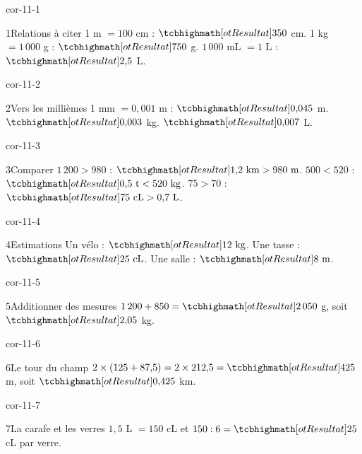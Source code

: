 \clearpage\pagestyle{otMain}\setlength{\otBlocEspacement}{2.5mm}\fontsize{11}{15}\selectfont{}
\begin{blocLivre}{cor-11-1}\begin{corrige}{1}{Relations à citer}
1 m $=100$ cm : $\res{350}$ cm. 1 kg $=1\,000$ g : $\res{750}$ g. $1\,000$ mL $=1$ L : $\res{2{,}5}$ L.
\end{corrige}\end{blocLivre}
\begin{blocLivre}{cor-11-2}\begin{corrige}{2}{Vers les millièmes}
1 mm $=0{,}001$ m : $\res{0{,}045}$ m. $\res{0{,}003}$ kg. $\res{0{,}007}$ L.
\end{corrige}\end{blocLivre}
\begin{blocLivre}{cor-11-3}\begin{corrige}{3}{Comparer}
$1\,200>980$ : $\res{1{,}2\ \mathrm{km}>980\ \mathrm m}$. $500<520$ : $\res{0{,}5\ \mathrm t<520\ \mathrm{kg}}$. $75>70$ : $\res{75\ \mathrm{cL}>0{,}7\ \mathrm L}$.
\end{corrige}\end{blocLivre}
\begin{blocLivre}{cor-11-4}\begin{corrige}{4}{Estimations}
Un vélo : $\res{12\ \mathrm{kg}}$. Une tasse : $\res{25\ \mathrm{cL}}$. Une salle : $\res{8\ \mathrm m}$.
\end{corrige}\end{blocLivre}
\begin{blocLivre}{cor-11-5}\begin{corrige}{5}{Additionner des mesures}
$1\,200+850=\res{2\,050}$ g, soit $\res{2{,}05}$ kg.
\end{corrige}\end{blocLivre}
\begin{blocLivre}{cor-11-6}\begin{corrige}{6}{Le tour du champ}
$2\times(125+87{,}5)=2\times212{,}5=\res{425}$ m, soit $\res{0{,}425}$ km.
\end{corrige}\end{blocLivre}
\begin{blocLivre}{cor-11-7}\begin{corrige}{7}{La carafe et les verres}
$1{,}5$ L $=150$ cL et $150:6=\res{25}$ cL par verre.
\end{corrige}\end{blocLivre}
